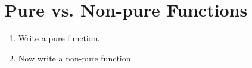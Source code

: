 \documentclass[10pt]{article}
\begin{document}
\section*{Pure vs. Non-pure Functions}
\begin{enumerate}
\item Write a pure function.
\item Now write a non-pure function.
\end{enumerate}
\end{document}
